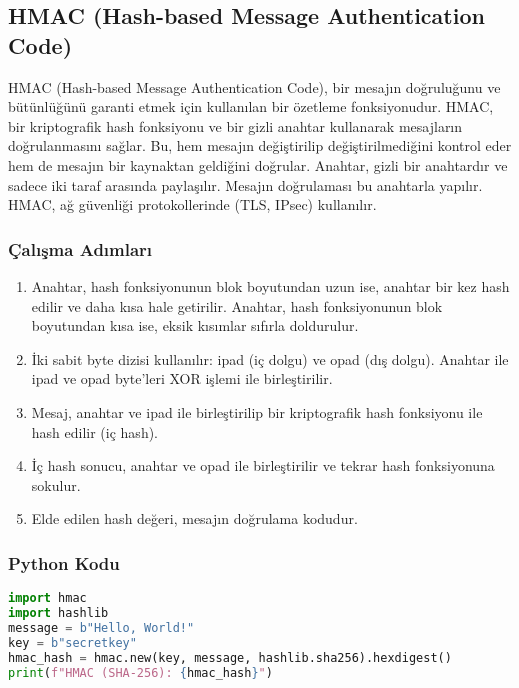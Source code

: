 \newpage

\subsection{HMAC (Hash-based Message Authentication Code)}

HMAC (Hash-based Message Authentication Code), bir mesajın doğruluğunu ve bütünlüğünü garanti etmek için kullanılan bir özetleme fonksiyonudur. HMAC, bir kriptografik hash fonksiyonu ve bir gizli anahtar kullanarak mesajların doğrulanmasını sağlar. Bu, hem mesajın değiştirilip değiştirilmediğini kontrol eder hem de mesajın bir kaynaktan geldiğini doğrular. Anahtar, gizli bir anahtardır ve sadece iki taraf arasında paylaşılır. Mesajın doğrulaması bu anahtarla yapılır. HMAC, ağ güvenliği protokollerinde (TLS, IPsec) kullanılır.

\subsubsection{Çalışma Adımları}

\begin{enumerate}
    \item Anahtar, hash fonksiyonunun blok boyutundan uzun ise, anahtar bir kez hash edilir ve daha kısa hale getirilir. Anahtar, hash fonksiyonunun blok boyutundan kısa ise, eksik kısımlar sıfırla doldurulur.
    \item İki sabit byte dizisi kullanılır: ipad (iç dolgu) ve opad (dış dolgu). Anahtar ile ipad ve opad byte'leri XOR işlemi ile birleştirilir.
    \item Mesaj, anahtar ve ipad ile birleştirilip bir kriptografik hash fonksiyonu ile hash edilir (iç hash).
    \item İç hash sonucu, anahtar ve opad ile birleştirilir ve tekrar hash fonksiyonuna sokulur.
    \item Elde edilen hash değeri, mesajın doğrulama kodudur.
\end{enumerate}

\subsubsection{Python Kodu}

\begin{lstlisting}[language=Python]
import hmac
import hashlib
message = b"Hello, World!"
key = b"secretkey"
hmac_hash = hmac.new(key, message, hashlib.sha256).hexdigest()
print(f"HMAC (SHA-256): {hmac_hash}")
\end{lstlisting}

